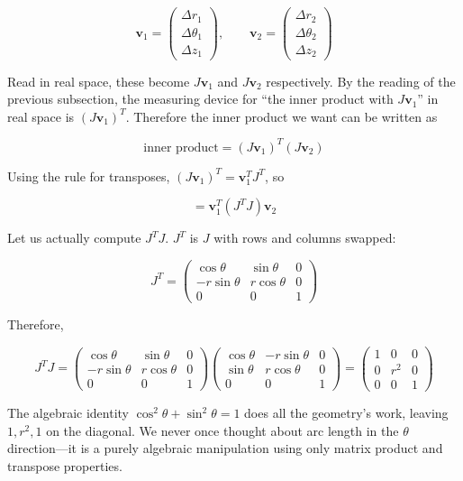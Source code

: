 \[\mathbf{v}_1 = \begin{pmatrix} \Delta r_1 \\ \Delta\theta_1 \\ \Delta z_1 \end{pmatrix},\qquad \mathbf{v}_2 = \begin{pmatrix} \Delta r_2 \\ \Delta\theta_2 \\ \Delta z_2 \end{pmatrix}\]

Read in real space, these become \(J\mathbf{v}_1\) and \(J\mathbf{v}_2\)
respectively. By the reading of the previous subsection, the measuring
device for ``the inner product with \(J\mathbf{v}_1\)'' in real space is
\((J\mathbf{v}_1)^T\). Therefore the inner product we want can be
written as

\[\text{inner product} = (J\mathbf{v}_1)^T (J\mathbf{v}_2)\]

Using the rule for transposes,
\((J\mathbf{v}_1)^T = \mathbf{v}_1^T J^T\), so

\[= \mathbf{v}_1^T (J^T J) \mathbf{v}_2\]

Let us actually compute \(J^T J\). \(J^T\) is \(J\) with rows and
columns swapped:

\[J^T = \begin{pmatrix}
\cos\theta & \sin\theta & 0 \\
-r\sin\theta & r\cos\theta & 0 \\
0 & 0 & 1
\end{pmatrix}\]

Therefore,

\[J^T J = \begin{pmatrix}
\cos\theta & \sin\theta & 0 \\
-r\sin\theta & r\cos\theta & 0 \\
0 & 0 & 1
\end{pmatrix}
\begin{pmatrix}
\cos\theta & -r\sin\theta & 0 \\
\sin\theta & r\cos\theta & 0 \\
0 & 0 & 1
\end{pmatrix}
= \begin{pmatrix}
1 & 0 & 0 \\
0 & r^2 & 0 \\
0 & 0 & 1
\end{pmatrix}\]

The algebraic identity \(\cos^2\theta + \sin^2\theta = 1\) does all the
geometry's work, leaving \(1, r^2, 1\) on the diagonal. We never once
thought about arc length in the \(\theta\) direction---it is a purely
algebraic manipulation using only matrix product and transpose
properties.

